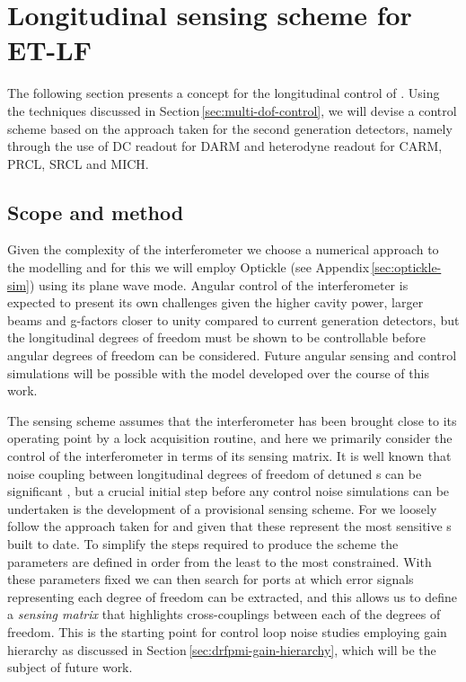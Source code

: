 \section{Longitudinal sensing scheme for ET-LF}
The following section presents a concept for the longitudinal control of \ETLF{}. Using the techniques discussed in Section\,\ref{sec:multi-dof-control}, we will devise a control scheme based on the approach taken for the second generation detectors, namely through the use of \gls{DC} readout for \gls{DARM} and heterodyne readout for \gls{CARM}, \gls{PRCL}, \gls{SRCL} and \gls{MICH}.

\subsection{Scope and method}
Given the complexity of the interferometer we choose a numerical approach to the modelling and for this we will employ Optickle (see Appendix\,\ref{sec:optickle-sim}) using its plane wave mode. Angular control of the interferometer is expected to present its own challenges given the higher cavity power, larger beams and g-factors closer to unity compared to current generation detectors, but the longitudinal degrees of freedom must be shown to be controllable before angular degrees of freedom can be considered. Future angular sensing and control simulations will be possible with the model developed over the course of this work.

The sensing scheme assumes that the interferometer has been brought close to its operating point by a lock acquisition routine, and here we primarily consider the control of the interferometer in terms of its sensing matrix. It is well known that noise coupling between longitudinal degrees of freedom of detuned \DRFPMI{}s can be significant \cite{Hild2007}, but a crucial initial step before any control noise simulations can be undertaken is the development of a provisional sensing scheme. For \ETLF{} we loosely follow the approach taken for \ALIGO{} \cite{Abbott2010} and \AVIRGO{} \cite{Vajente2008} given that these represent the most sensitive \DRFPMI{}s built to date. To simplify the steps required to produce the scheme the parameters are defined in order from the least to the most constrained. With these parameters fixed we can then search for ports at which error signals representing each degree of freedom can be extracted, and this allows us to define a \emph{sensing matrix} that highlights cross-couplings between each of the degrees of freedom. This is the starting point for control loop noise studies employing gain hierarchy as discussed in Section\,\ref{sec:drfpmi-gain-hierarchy}, which will be the subject of future work.

